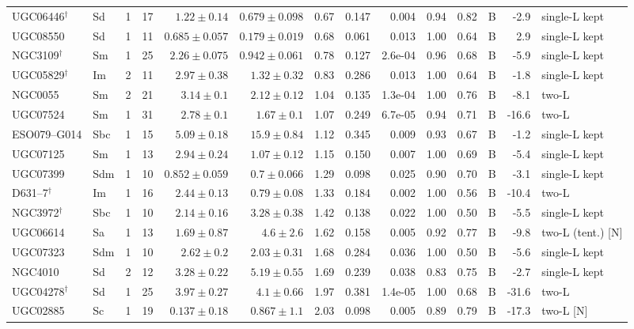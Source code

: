 \documentclass[9pt]{extarticle}
\begin{document}
{\begin{longtable}{lllrrrrrrrrcrl}
UGC06446$^\dagger$ & Sd & 1 & 17 & $1.22\pm0.14$ & $0.679\pm0.098$ & 0.67 & 0.147 & 0.004 & 0.94 & 0.82 & B & -2.9 & single-L kept\\
UGC08550 & Sd & 1 & 11 & $0.685\pm0.057$ & $0.179\pm0.019$ & 0.68 & 0.061 & 0.013 & 1.00 & 0.64 & B & 2.9 & single-L kept\\
NGC3109$^\dagger$ & Sm & 1 & 25 & $2.26\pm0.075$ & $0.942\pm0.061$ & 0.78 & 0.127 & 2.6e-04 & 0.96 & 0.68 & B & -5.9 & single-L kept\\
UGC05829$^\dagger$ & Im & 2 & 11 & $2.97\pm0.38$ & $1.32\pm0.32$ & 0.83 & 0.286 & 0.013 & 1.00 & 0.64 & B & -1.8 & single-L kept\\
NGC0055 & Sm & 2 & 21 & $3.14\pm0.1$ & $2.12\pm0.12$ & 1.04 & 0.135 & 1.3e-04 & 1.00 & 0.76 & B & -8.1 & two-L\\
UGC07524 & Sm & 1 & 31 & $2.78\pm0.1$ & $1.67\pm0.1$ & 1.07 & 0.249 & 6.7e-05 & 0.94 & 0.71 & B & -16.6 & two-L\\
ESO079--G014 & Sbc & 1 & 15 & $5.09\pm0.18$ & $15.9\pm0.84$ & 1.12 & 0.345 & 0.009 & 0.93 & 0.67 & B & -1.2 & single-L kept\\
UGC07125 & Sm & 1 & 13 & $2.94\pm0.24$ & $1.07\pm0.12$ & 1.15 & 0.150 & 0.007 & 1.00 & 0.69 & B & -5.4 & single-L kept\\
UGC07399 & Sdm & 1 & 10 & $0.852\pm0.059$ & $0.7\pm0.066$ & 1.29 & 0.098 & 0.025 & 0.90 & 0.70 & B & -3.1 & single-L kept\\
D631--7$^\dagger$ & Im & 1 & 16 & $2.44\pm0.13$ & $0.79\pm0.08$ & 1.33 & 0.184 & 0.002 & 1.00 & 0.56 & B & -10.4 & two-L\\
NGC3972$^\dagger$ & Sbc & 1 & 10 & $2.14\pm0.16$ & $3.28\pm0.38$ & 1.42 & 0.138 & 0.022 & 1.00 & 0.50 & B & -5.5 & single-L kept\\
UGC06614 & Sa & 1 & 13 & $1.69\pm0.87$ & $4.6\pm2.6$ & 1.62 & 0.158 & 0.005 & 0.92 & 0.77 & B & -9.8 & two-L (tent.) [N]\\
UGC07323 & Sdm & 1 & 10 & $2.62\pm0.2$ & $2.03\pm0.31$ & 1.68 & 0.284 & 0.036 & 1.00 & 0.50 & B & -5.6 & single-L kept\\
NGC4010 & Sd & 2 & 12 & $3.28\pm0.22$ & $5.19\pm0.55$ & 1.69 & 0.239 & 0.038 & 0.83 & 0.75 & B & -2.7 & single-L kept\\
UGC04278$^\dagger$ & Sd & 1 & 25 & $3.97\pm0.27$ & $4.1\pm0.66$ & 1.97 & 0.381 & 1.4e-05 & 1.00 & 0.68 & B & -31.6 & two-L\\
UGC02885 & Sc & 1 & 19 & $0.137\pm0.18$ & $0.867\pm1.1$ & 2.03 & 0.098 & 0.005 & 0.89 & 0.79 & B & -17.3 & two-L [N]\\

\end{longtable}}
\end{document}
